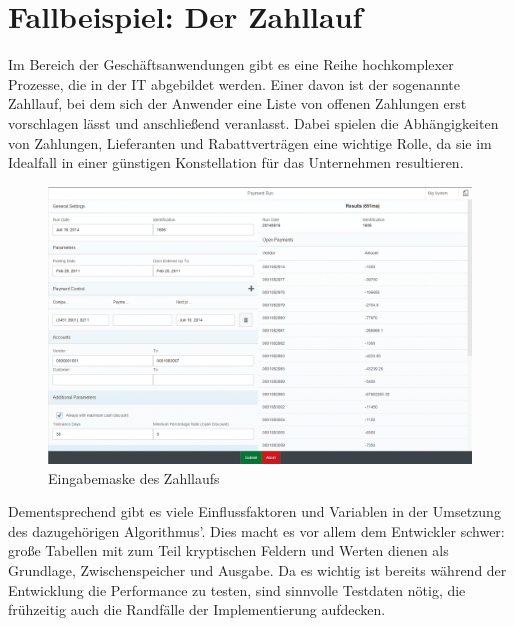 \section{Fallbeispiel: Der Zahllauf}\label{chap:paymentrun}

%
%

Im Bereich der Geschäftsanwendungen gibt es eine Reihe hochkomplexer Prozesse, die in der IT abgebildet werden.
Einer davon ist der sogenannte Zahllauf, bei dem sich der Anwender eine Liste von offenen Zahlungen erst vorschlagen lässt und anschließend veranlasst.
Dabei spielen die Abhängigkeiten von Zahlungen, Lieferanten und Rabattverträgen eine wichtige Rolle, da sie im Idealfall in einer günstigen Konstellation für das Unternehmen resultieren.

\begin{figure}[ht]
	\centering
  \includegraphics[width=1\textwidth]{figures/paymentrun.png}
	\caption{Eingabemaske des Zahllaufs}
	\label{fig:paymentrun}
\end{figure}

Dementsprechend gibt es viele Einflussfaktoren und Variablen in der Umsetzung des dazugehörigen Algorithmus'.
Dies macht es vor allem dem Entwickler schwer: große Tabellen mit zum Teil kryptischen Feldern und Werten dienen als Grundlage, Zwischenspeicher und Ausgabe.
Da es wichtig ist bereits während der Entwicklung die Performance zu testen, sind sinnvolle Testdaten nötig, die frühzeitig auch die Randfälle der Implementierung aufdecken.

